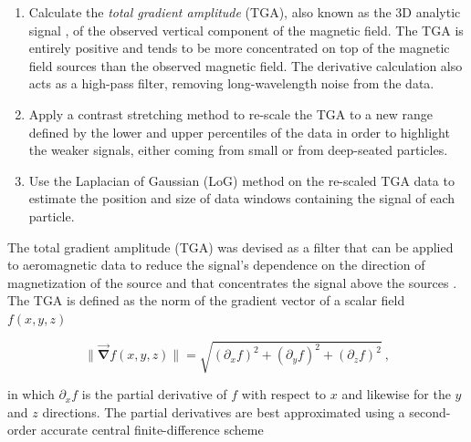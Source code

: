 \begin{enumerate}
\item Calculate the \textit{total gradient amplitude} (TGA), also known as the 3D analytic signal \citep{Roest1992Magnetic}, of the observed vertical   component of the magnetic field. The TGA is entirely positive and tends to be more concentrated on top of the magnetic field sources than the observed magnetic field. The derivative calculation also acts as a high-pass filter, removing long-wavelength noise from the data.
\item Apply a contrast stretching method to re-scale the TGA to a new range   defined by the lower and upper percentiles of the data in order to highlight the weaker signals, either coming from small or from deep-seated particles.
\item Use the Laplacian of Gaussian (LoG) method \citep{VanderWalt2014} on the   re-scaled TGA data to estimate the position and size of data windows containing the signal of each particle.
\end{enumerate}

The total gradient amplitude (TGA) was devised as a filter that can be applied
to aeromagnetic data to reduce the signal's dependence on the direction of
magnetization of the source and that concentrates the signal above the sources
\citep{Roest1992Magnetic, Nabighian2005}. The TGA is defined as the norm of the
gradient vector of a scalar field $f(x, y, z)$

\begin{equation}
\|\vec{\mathbf{\nabla}}f(x, y, z)\|  =
\sqrt{(\partial_x f)^2 + (\partial_y f)^2 + (\partial_z f)^2}
\ ,
\end{equation}

\noindent
in which $\partial_x f$ is the partial derivative of $f$ with respect to $x$
and likewise for the $y$ and $z$ directions. The partial derivatives are best
approximated using a second-order accurate central finite-difference scheme

